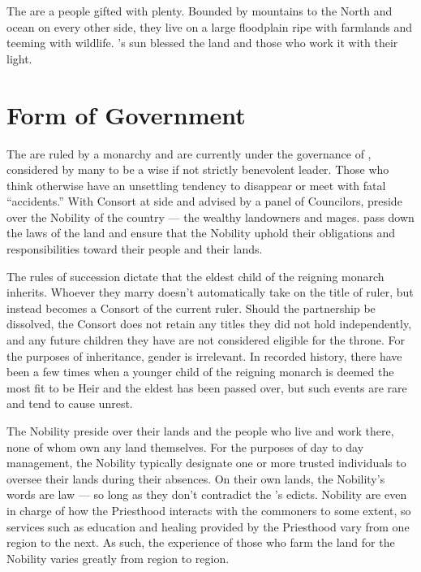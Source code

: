 \documentclass[blue]{GL2020}
\begin{document}
\name{\bAgrarians{}}

The \pFarmers{} are a people gifted with plenty. Bounded by mountains to the North and ocean on every other side, they live on a large floodplain ripe with farmlands and teeming with wildlife. \cFarmGod{}’s sun blessed the land and those who work it with their light.    

\section*{Form of Government}
The \pFarm{} are ruled by a monarchy and are currently under the governance of \cQueen{\full}, considered by many to be a wise if not strictly benevolent leader. Those who think otherwise have an unsettling tendency to disappear or meet with fatal ``accidents.'' With \cQueen{\their} Consort at \cQueen{\their} side and advised by a panel of Councilors, \cQueen{\they} preside\cQueen{\plural} over the Nobility of the country — the wealthy landowners and mages. \cQueen{\They} pass\cQueen{\pluralC} down the laws of the land and ensure that the Nobility uphold their obligations and responsibilities toward their people and their lands.

The rules of succession dictate that the eldest child of the reigning monarch inherits. Whoever they marry doesn't automatically take on the title of ruler, but instead becomes a Consort of the current ruler. Should the partnership be dissolved, the Consort does not retain any titles they did not hold independently, and any future children they have are not considered eligible for the throne. For the purposes of inheritance, gender is irrelevant. In recorded history, there have been a few times when a younger child of the reigning monarch is deemed the most fit to be Heir and the eldest has been passed over, but such events are rare and tend to cause unrest.

The Nobility preside over their lands and the people who live and work there, none of whom own any land themselves. For the purposes of day to day management, the Nobility typically designate one or more trusted individuals to oversee their lands during their absences. On their own lands, the Nobility's words are law — so long as they don't contradict the \cQueen{\Majesty}'s edicts. Nobility are even in charge of how the Priesthood interacts with the commoners to some extent, so services such as education and healing provided by the Priesthood vary from one region to the next. As such, the experience of those who farm the land for the Nobility varies greatly from region to region. 
\end{document}
